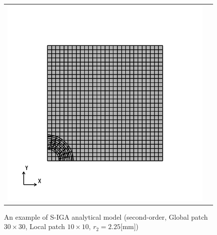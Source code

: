 \begin{figure}[hbtp]
  \begin{tabular}{cc}
    \begin{minipage}[t]{0.45\hsize}
      \centering
      \includegraphics[keepaspectratio, scale=0.35]
      {fig/result_data_etc/s-iga04/model/2.25.png}
      \caption{An example of S-IGA analytical model (second-order, Global patch $30\times 30$, Local patch $10\times 10$, $r_2 = 2.25$[mm])}
      \label{fig:s-iga04 model 2.25}
    \end{minipage} &
    \begin{minipage}[t]{0.45\hsize}
      \centering
      \includegraphics[keepaspectratio, scale=0.35]

\end{minipage}
\end{tabular}
\end{figure}
